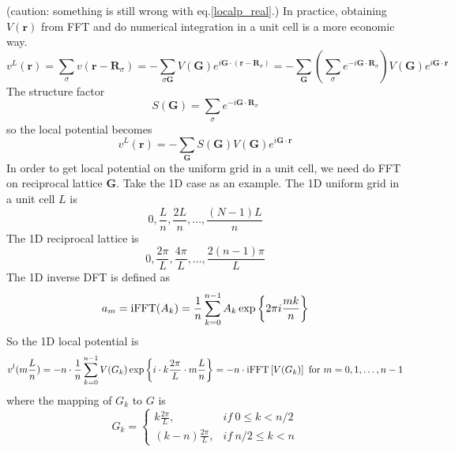 \documentclass{article}
\begin{document}
            (caution: something is still wrong with eq.\eqref{localp_real}.)
            In practice, obtaining $V(\textbf{r})$ from FFT and do numerical integration in a unit cell is a more economic way.
            \begin{equation*}
                v^L(\textbf{r}) = \sum_{\sigma}v(\textbf{r}-\textbf{R}_{\sigma}) = 
                -\sum_{\sigma\textbf{G}}V(\textbf{G})e^{i\textbf{G}\cdot(\textbf{r}-\textbf{R}_{\sigma})} =
                -\sum_{\textbf{G}}\left(\sum_{\sigma}e^{-i\textbf{G}\cdot\textbf{R}_{\sigma}}\right)V(\textbf{G})e^{i\textbf{G}\cdot\textbf{r}}
            \end{equation*}
            The structure factor
            \begin{equation}
                S(\textbf{G}) = \sum_{\sigma}e^{-i\textbf{G}\cdot\textbf{R}_{\sigma}}
            \end{equation}
            so the local potential becomes
            \begin{equation}
                v^L(\textbf{r}) = -\sum_{\textbf{G}}S(\textbf{G})V(\textbf{G})e^{i\textbf{G}\cdot\textbf{r}}
            \end{equation}
            In order to get local potential on the uniform grid in a unit cell, 
            we need do FFT on reciprocal lattice $\textbf{G}$.
            Take the 1D case as an example.
            The 1D uniform grid in a unit cell $L$ is
            $$ 0,\frac{L}{n},\frac{2L}{n},\dots,\frac{(N-1)L}{n} $$
            The 1D reciprocal lattice is
            $$ 0,\frac{2\pi}{L},\frac{4\pi}{L},\dots,\frac{2(n-1)\pi}{L} $$
            The 1D inverse DFT is defined as
            \begin{equation}
                a_m = {\rm iFFT}(A_k) = \frac{1}{n}\sum_{k=0}^{n-1}A_k\exp\left\{2\pi i\frac{mk}{n}\right\}
            \end{equation}
            So the 1D local potential is
            \begin{equation}
                v^l(m\frac{L}{n}) = -n\cdot\frac{1}{n}\sum_{k=0}^{n-1}V(G_k)\exp\left\{i\cdot k\frac{2\pi}{L}\cdot m\frac{L}{n}\right\}
                = -n\cdot {\rm iFFT}\left[V(G_k)\right]\ {\rm for}\ m = 0,1,\dots,n-1
            \end{equation}
            where the mapping of $G_k$ to $G$ is
            \begin{equation}
                G_k = \begin{cases}
                    k\frac{2\pi}{L}, & if\ 0\leq k<n/2 \\
                    (k-n)\frac{2\pi}{L}, & if\ n/2\leq k<n
                \end{cases}
            \end{equation}
\end{document}
